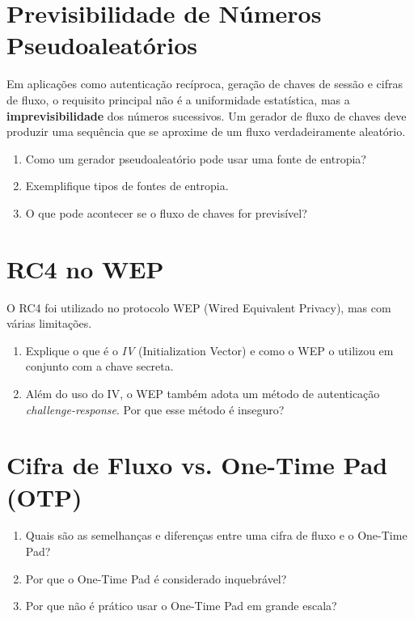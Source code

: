 \section{Previsibilidade de Números Pseudoaleatórios}  
    
    Em aplicações como autenticação recíproca, geração de chaves de sessão e cifras de fluxo, o requisito principal não é a uniformidade estatística, mas a \textbf{imprevisibilidade} dos números sucessivos. Um gerador de fluxo de chaves deve produzir uma sequência que se aproxime de um fluxo verdadeiramente aleatório.
    \begin{enumerate}
        \item Como um gerador pseudoaleatório pode usar uma fonte de entropia?
        \item Exemplifique tipos de fontes de entropia.
        \item O que pode acontecer se o fluxo de chaves for previsível?
    \end{enumerate}

\section{RC4 no WEP}  
    
    O RC4 foi utilizado no protocolo WEP (Wired Equivalent Privacy), mas com várias limitações.
    \begin{enumerate}
        \item Explique o que é o \textit{IV} (Initialization Vector) e como o WEP o utilizou em conjunto com a chave secreta.
        \item Além do uso do IV, o WEP também adota um método de autenticação \textit{challenge-response}. Por que esse método é inseguro?
    \end{enumerate}

\section{Cifra de Fluxo vs. One-Time Pad (OTP)}
    \begin{enumerate}
        \item Quais são as semelhanças e diferenças entre uma cifra de fluxo e o One-Time Pad?
        \item Por que o One-Time Pad é considerado inquebrável?
        \item Por que não é prático usar o One-Time Pad em grande escala?
    \end{enumerate}

